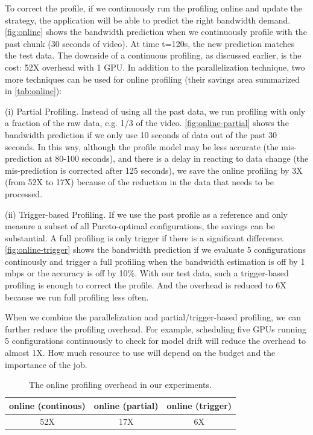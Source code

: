 To correct the profile, if we continuously run the profiling online and update
the strategy, the application will be able to predict the right bandwidth
demand. \autoref{fig:online} shows the bandwidth prediction when we continuously
profile with the past chunk (30 seconds of video). At time t=120s, the new
prediction matches the test data. The downside of a continuous profiling, as
discussed earlier, is the cost: 52X overhead with 1 GPU. In addition to the
parallelization technique, two more techniques can be used for online profiling
(their savings area summarized in \autoref{tab:online}):

(i) Partial Profiling. Instead of using all the past data, we run profiling with
only a fraction of the raw data, e.g. 1/3 of the video.
\autoref{fig:online-partial} shows the bandwidth prediction if we only use 10
seconds of data out of the past 30 seconds. In this way, although the profile
model may be less accurate (the mis-prediction at 80-100 seconds), and there is
a delay in reacting to data change (the mis-prediction is corrected after 125
seconds), we save the online profiling by 3X (from 52X to 17X) because of the
reduction in the data that needs to be processed.

(ii) Trigger-based Profiling. If we use the past profile as a reference and only
measure a subset of all Pareto-optimal configurations, the savings can be
substantial. A full profiling is only trigger if there is a significant
difference. \autoref{fig:online-trigger} shows the bandwidth prediction if we
evaluate 5 configurations continously and trigger a full profiling when the
bandwidth estimation is off by 1 mbps or the accuracy is off by 10\%. With our
test data, such a trigger-based profiling is enough to correct the profile.  And
the overhead is reduced to 6X because we run full profiling less often.

When we combine the parallelization and partial/trigger-based profiling, we can
further reduce the profiling overhead. For example, scheduling five GPUs running
5 configurations continuously to check for model drift will reduce the overhead
to almost 1X. How much resource to use will depend on the budget and the
importance of the job.


\begin{table}[t]
  \centering
  \begin{tabular}{c c c}
    \toprule
    online (continous) & online (partial) & online (trigger) \\
    \midrule
    52X   & 17X              & 6X \\
    \bottomrule
  \end{tabular}
  \caption{The online profiling overhead in our experiments.}
  \label{tab:online}
\end{table}

